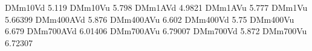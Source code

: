 DMm10Vd 5.119
DMm10Vu 5.798
DMm1AVd 4.9821
DMm1AVu 5.777
DMm1Vu 5.66399
DMm400AVd 5.876
DMm400AVu 6.602
DMm400Vd 5.75
DMm400Vu 6.679
DMm700AVd 6.01406
DMm700AVu 6.79007
DMm700Vd 5.872
DMm700Vu 6.72307
